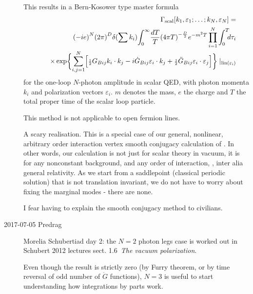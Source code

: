 \begin{description}
This results in a Bern-Kosower type master formula
\begin{eqnarray}
&&\!\!\!\!\!\!\!
\Gamma_{\rm scal}[k_1,\varepsilon_1;\ldots;k_N,\varepsilon_N]
=
\label{Schubert12(1.43)}\\
&&\quad{(-ie)}^N
{(2\pi )}^D\delta (\sum k_i)
{\displaystyle\int_{0}^{\infty}}{dT\over T}
{(4\pi T)}^{-{D\over 2}} e^{-m^2T}
\prod_{i=1}^N \int_0^T\!\!\!d\tau_i
\continue
&&
\quad %
\times
\exp\biggl\lbrace\sum_{i,j=1}^N
\Bigl\lbrack  \half G_{Bij} k_i\cdot k_j
-i\dot G_{Bij}\varepsilon_i\cdot k_j
+\half\ddot G_{Bij}\varepsilon_i\cdot\varepsilon_j
\Bigr\rbrack\biggr\rbrace
\mid_{\rm {\rm lin}(\varepsilon_i)}
\nonumber
\end{eqnarray}
for the one-loop
$N$-photon amplitude in scalar QED, with photon
momenta $k_i$ and polarization vectors
$\varepsilon_i$. $m$ denotes the mass, $e$ the charge and $T$ the total proper time
of the scalar loop particle.


This method is not applicable to open
fermion lines.

A scary realisation. This is a special case of our general, nonlinear,
arbitrary order interaction vertex smooth conjugacy calculation of
. In other words, our calculation is not just for
scalar theory in vacuum, it is for any nonconstant background, and any
order of interaction, \ie, inter alia general relativity. As we start from
a saddlepoint (classical periodic solution) that is not translation
invariant, we do not have to worry about fixing the marginal modes -
there are none.

I fear having to explain the smooth conjugacy method to civilians.

\item[2017-07-05 Predrag] Morelia Schubertiad day 2:
the $N=2$ photon legs case is worked out in Schubert 2012
lectures sect. 1.6~{\em The vacuum polarization}.

Even though the result is strictly zero (by Furry theorem, or by time
reversal of odd number of $\dot{G}$ functions),
$N=3$ is useful to start understanding how integrations by parts work.


\end{description}
